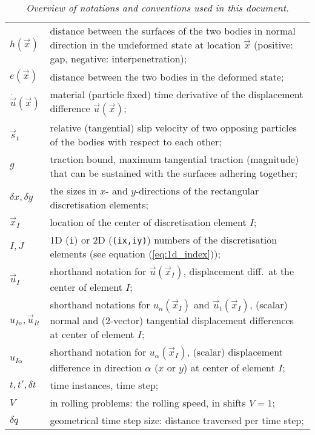 \documentclass[12pt]{report}
\newcommand{\var}[1]{\mbox{\tt #1}}
\begin{document}
\begin{table}[p]
\begin{tabular}{lp{140mm}}
$h(\vec{x})$  & distance between the surfaces of the two bodies in normal
                direction in the undeformed state at location $\vec{x}$
                (positive: gap, negative: interpenetration); \\[0.5ex]
$e(\vec{x})$  & distance between the two bodies in the deformed state; \\[0.5ex]
$\dot{\vec{u}}(\vec{x})$ & material (particle fixed) time derivative of
                the displacement difference $\vec{u}(\vec{x})$; \\[0.5ex]
$\vec{s}_t$   & relative (tangential) slip velocity of two opposing particles
                of the bodies with respect to each other; \\[0.5ex]
$g$           & traction bound, maximum tangential traction (magnitude) that
                can be sustained with the surfaces adhering together; \\[1.5ex]

$\delta x, \delta y$ & the sizes in $x$- and $y$-directions of the
                rectangular discretisation elements; \\[0.5ex]
$\vec{x}_I$   & location of the center of discretisation element $I$; \\[0.5ex]
$I, J$        & 1D (\var{i}) or 2D (\var{(ix,iy)}) numbers of the
                discretisation elements (see equation (\ref{eq:1d_index}));
                \\[0.5ex]
$\vec{u}_{I}$ & shorthand notation for $\vec{u}(\vec{x}_I)$, displacement
                diff.\ at the center of element $I$; \\[0.5ex]
$u_{In}, \vec{u}_{It}$ & shorthand notations for $u_n(\vec{x}_I)$ and
                $\vec{u}_t(\vec{x}_I)$, (scalar) normal and (2-vector)
                tangential displacement differences at center of element
                $I$; \\[0.5ex]
$u_{I\alpha}$ & shorthand notation for $u_\alpha(\vec{x}_I)$, (scalar)
                displacement difference in direction $\alpha$ ($x$ or $y$)
                at center of element $I$; \\[0.5ex]
$t, t', \delta t$ & time instances, time step; \\[0.5ex]
$V$           & in rolling problems: the rolling speed, in shifts $V=1$; \\[0.5ex]
$\delta q$    & geometrical time step size: distance traversed per time
                step; \\[0.5ex]
\end{tabular}
\caption{\em Overview of notations and conventions used in this document.}
\label{tbl:notations}
\end{table}
\end{document}
